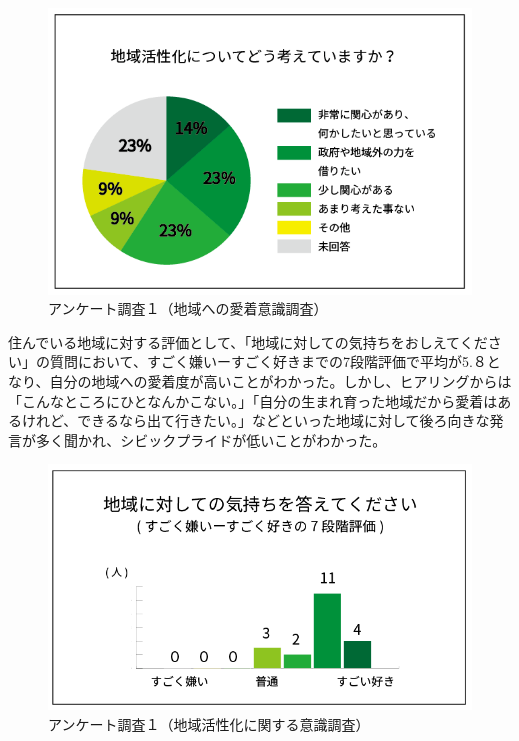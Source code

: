 \documentclass[a4paper]{jsarticle}
\begin{document}
\begin{figure}[H]
  \begin{center}
    \includegraphics[width=0.95\hsize]{./images/02.png}
    \caption{アンケート調査１（地域への愛着意識調査）}
    \label{fig:tmu_hino}
  \end{center}
\end{figure}

住んでいる地域に対する評価として、「地域に対しての気持ちをおしえてください」の質問において、すごく嫌いーすごく好きまでの7段階評価で平均が5.８となり、自分の地域への愛着度が高いことがわかった。しかし、ヒアリングからは「こんなところにひとなんかこない。」「自分の生まれ育った地域だから愛着はあるけれど、できるなら出て行きたい。」などといった地域に対して後ろ向きな発言が多く聞かれ、シビックプライドが低いことがわかった。\par
\begin{figure}[H]
  \begin{center}
    \includegraphics[width=0.95\hsize]{./images/03.png}
    \caption{アンケート調査１（地域活性化に関する意識調査）}
    \label{fig:tmu_hino}
  \end{center}
\end{figure}
\end{document}
